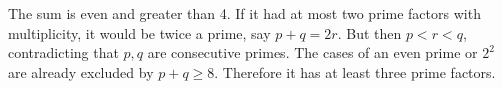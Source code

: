 The sum is even and greater than 4. If it had at most two prime factors with multiplicity, it would be twice a prime, say $p+q=2r$. But then $p<r<q$, contradicting that $p,q$ are consecutive primes. The cases of an even prime or $2^2$ are already excluded by $p+q\ge8$. Therefore it has at least three prime factors.
